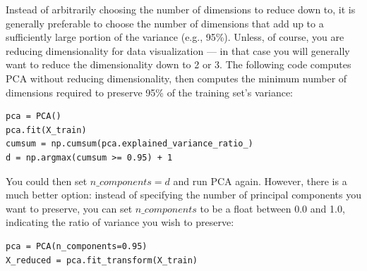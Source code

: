 \documentclass{beamer}
\begin{document}
\begin{frame}
Instead of arbitrarily choosing the number of dimensions to reduce down to, it is generally preferable to
choose the number of dimensions that add up to a sufficiently large portion of the variance (e.g., 95\%).
Unless, of course, you are reducing dimensionality for data visualization — in that case you will
generally want to reduce the dimensionality down to 2 or 3.
The following code computes PCA without reducing dimensionality, then computes the minimum number
of dimensions required to preserve 95\% of the training set’s variance:





\begin{verbatim}
pca = PCA()
pca.fit(X_train)
cumsum = np.cumsum(pca.explained_variance_ratio_)
d = np.argmax(cumsum >= 0.95) + 1

\end{verbatim}

You could then set $n\_components=d$ and run PCA again. However, there is a much better option: instead
of specifying the number of principal components you want to preserve, you can set $n\_components$ to be
a float between 0.0 and 1.0, indicating the ratio of variance you wish to preserve:



\begin{verbatim}
pca = PCA(n_components=0.95)
X_reduced = pca.fit_transform(X_train)

\end{verbatim}
\end{frame}
\end{document}
